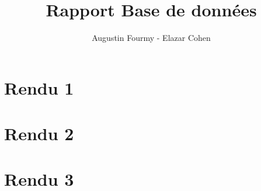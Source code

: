 \documentclass[french]{report}
\title{Rapport Base de données}
\author{Augustin Fourmy - Elazar Cohen}
\begin{document}
	\maketitle
	\tableofcontents
	\newpage
	
	\chapter{Rendu 1}
	
	
	\chapter{Rendu 2}
	
	
	\chapter{Rendu 3}
	
	
	

	
	
	
	
	
	
	
	
	
	
	
	
	
	
	
	
	
	
	
	
	
	
	
	
	

	
\end{document}
